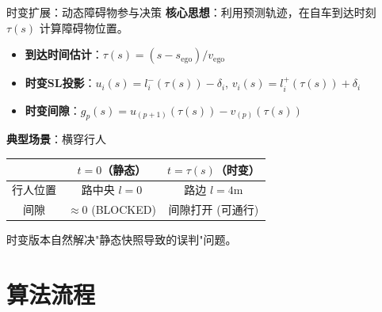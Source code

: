 \documentclass[aspectratio=169,10pt,fontset=none]{ctexbeamer}
\begin{document}
\begin{frame}{时变扩展：动态障碍物参与决策}
  \textbf{核心思想}：利用预测轨迹，在自车到达时刻 $\tau(s)$ 计算障碍物位置。

  \vspace{0.3cm}
  \begin{itemize}
    \item \textbf{到达时间估计}：$\tau(s) = (s - s_{\text{ego}}) / v_{\text{ego}}$
    \item \textbf{时变SL投影}：$u_i(s) = l_i^-(\tau(s)) - \delta_i$,\; $v_i(s) = l_i^+(\tau(s)) + \delta_i$
    \item \textbf{时变间隙}：$g_p(s) = u_{(p+1)}(\tau(s)) - v_{(p)}(\tau(s))$
  \end{itemize}

  \vspace{0.3cm}
  \textbf{典型场景}：横穿行人

  \begin{center}
    \begin{tabular}{ccc}
      \toprule
      & $t=0$（静态） & $t=\tau(s)$（时变） \\
      \midrule
      行人位置 & 路中央 $l=0$ & 路边 $l=4$m \\
      间隙 & $\approx 0$ (\textcolor{apored}{BLOCKED}) & 间隙打开 (\textcolor{apogreen}{可通行}) \\
      \bottomrule
    \end{tabular}
  \end{center}

  \vspace{0.2cm}
  时变版本自然解决"静态快照导致的误判"问题。
\end{frame}

\section{算法流程}
\end{document}
